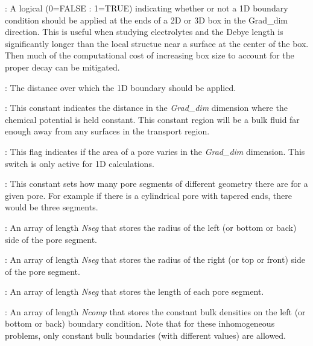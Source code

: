 \documentclass[10pt,onecolumn]{article}
\begin{document}
\vspace{0.1in}
:  A logical (0=FALSE : 1=TRUE) indicating
whether or not a 1D boundary condition should be applied at the
ends of a 2D or 3D box in the Grad\_dim direction.  This is useful
when studying electrolytes and the Debye length is significantly
longer than the local structue near a surface at the center of the
box.  Then much of the computational cost of increasing box size
to account for the proper decay can be mitigated.

\vspace{0.1in}
:  The distance over which the 1D boundary should
be applied.

\vspace{0.1in}
:  This constant indicates the distance
in the {\it Grad\_dim} dimension where the chemical potential is
held constant.  This constant region will be a bulk
fluid far enough away from any surfaces in the transport region.

\vspace{0.1in}
: This flag indicates if the
area of a pore varies in the {\it Grad\_dim}
dimension.  This switch is only active for 1D calculations.

\vspace{0.1in}
: This constant sets how many pore segments
of different geometry there are for a given pore.  For example
if there is a cylindrical pore with tapered ends, there would
be three segments.

\vspace{0.1in}
: An array of length {\it Nseg} that stores
the radius of the left (or bottom or back) side of the pore segment.

\vspace{0.1in}
: An array of length {\it Nseg} that stores
the radius of the right (or top or front) side of the pore segment.

\vspace{0.1in}
: An array of length {\it Nseg} that stores
the length of each pore segment.

\vspace{0.1in}
:  An array of length {\it Ncomp} that
stores the constant bulk densities on the left (or bottom or back)
boundary condition.  Note that for these inhomogeneous problems,
only constant bulk boundaries (with different values) are allowed.
\end{document}
